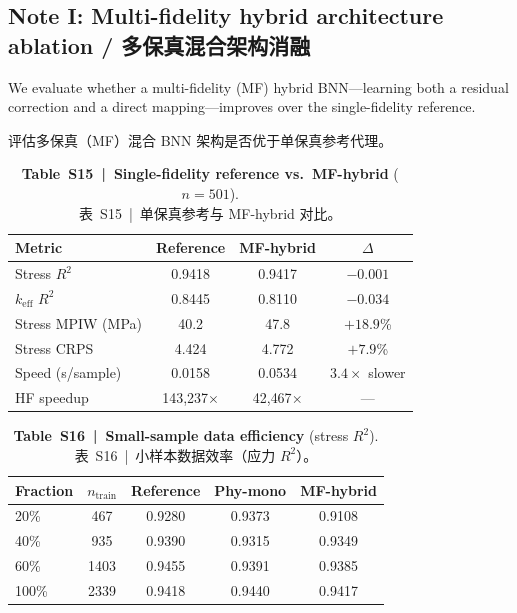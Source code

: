 \documentclass[11pt,a4paper]{article}
\newcommand{\keff}{\ensuremath{k_{\mathrm{eff}}}}
\begin{document}
\subsection{Note I: Multi-fidelity hybrid architecture ablation /
多保真混合架构消融}
\label{sec:noteI}

We evaluate whether a multi-fidelity (MF) hybrid BNN---learning both a
residual correction and a direct mapping---improves over the
single-fidelity reference.

评估多保真（MF）混合 BNN 架构是否优于单保真参考代理。

\begin{table}[htbp]
\centering
\caption{\textbf{Table~S15~|~Single-fidelity reference vs.\ MF-hybrid}
($n = 501$).\\
\small 表~S15~|~单保真参考与 MF-hybrid 对比。}
\label{tab:S15}
\smallskip\small
\begin{tabular}{lccc}
\toprule
Metric & Reference & MF-hybrid & $\Delta$ \\
\midrule
Stress $R^2$      & 0.9418 & 0.9417 & $-0.001$ \\
\keff{} $R^2$     & 0.8445 & 0.8110 & $-0.034$ \\
Stress MPIW (MPa) & 40.2   & 47.8   & $+18.9$\% \\
Stress CRPS       & 4.424  & 4.772  & $+7.9$\% \\
Speed (s/sample)  & 0.0158 & 0.0534 & $3.4\times$ slower \\
HF speedup        & 143{,}237$\times$ & 42{,}467$\times$ & --- \\
\bottomrule
\end{tabular}
\end{table}

\begin{table}[htbp]
\centering
\caption{\textbf{Table~S16~|~Small-sample data efficiency} (stress $R^2$).\\
\small 表~S16~|~小样本数据效率（应力 $R^2$）。}
\label{tab:S16}
\smallskip\small
\begin{tabular}{lcccc}
\toprule
Fraction & $n_{\mathrm{train}}$ & Reference & Phy-mono & MF-hybrid \\
\midrule
20\%  & 467  & 0.9280 & 0.9373 & 0.9108 \\
40\%  & 935  & 0.9390 & 0.9315 & 0.9349 \\
60\%  & 1403 & 0.9455 & 0.9391 & 0.9385 \\
100\% & 2339 & 0.9418 & 0.9440 & 0.9417 \\
\bottomrule
\end{tabular}
\end{table}
\end{document}
